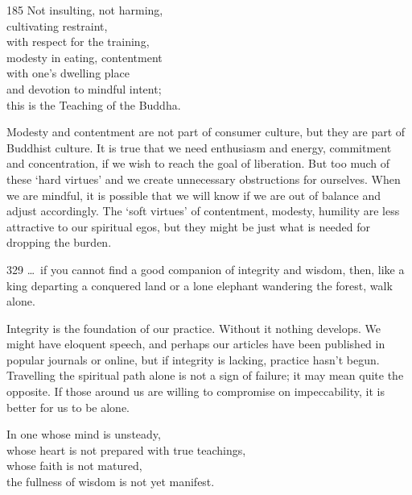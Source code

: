 
\begin{dhpVerse}{185}
\label{dhp-185}
Not insulting, not harming,\\
cultivating restraint,\\
with respect for the training,\\
modesty in eating, contentment\\
with one's dwelling place\\
and devotion to mindful intent;\\
this is the Teaching of the Buddha.
\end{dhpVerse}

\begin{dhpRefl}
  Modesty and contentment are not part of consumer culture, but they are part of
  Buddhist culture. It is true that we need enthusiasm and energy, commitment
  and concentration, if we wish to reach the goal of liberation. But too much of
  these ‘hard virtues’ and we create unnecessary obstructions for ourselves.
  When we are mindful, it is possible that we will know if we are out of balance
  and adjust accordingly. The ‘soft virtues’ of contentment, modesty, humility
  are less attractive to our spiritual egos, but they might be just what is
  needed for dropping the burden.
\end{dhpRefl}


\begin{dhpVerse}{329}
\label{dhp-329}
\ldots\ if you cannot find a good companion
of integrity and wisdom,
then, like a king departing a conquered land
or a lone elephant wandering the forest,
walk alone.
\end{dhpVerse}

\begin{dhpRefl}
  Integrity is the foundation of our practice. Without it nothing develops. We
  might have eloquent speech, and perhaps our articles have been published in
  popular journals or online, but if integrity is lacking, practice hasn’t
  begun. Travelling the spiritual path alone is not a sign of failure; it may
  mean quite the opposite. If those around us are willing to compromise on
  impeccability, it is better for us to be alone.
\end{dhpRefl}


\begin{dhpVerse}{38}
\label{dhp-38}
In one whose mind is unsteady,\\
whose heart is not prepared with true teachings,\\
whose faith is not matured,\\
the fullness of wisdom is not yet manifest.
\end{dhpVerse}

